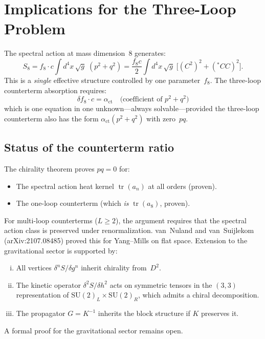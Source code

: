 \documentclass[12pt,a4paper]{article}
\newcommand{\tr}{\operatorname{tr}}
\begin{document}
\section{Implications for the Three-Loop Problem}
\label{sec:fund}

The spectral action at mass dimension~8 generates:
\begin{equation}
  S_8 = f_8 \cdot c \int d^4x\,\sqrt{g}\; (p^2 + q^2)
  = \frac{f_8 c}{2} \int d^4x\,\sqrt{g}\;
  \bigl[(C^2)^2 + ({}^*\!CC)^2\bigr].
\end{equation}
This is a \emph{single} effective structure controlled by one parameter~$f_8$.
The three-loop counterterm absorption requires:
\begin{equation}
  \delta f_8 \cdot c = \alpha_{\mathrm{ct}} \quad \text{(coefficient of } p^2{+}q^2)
\end{equation}
which is one equation in one unknown---always solvable---provided the
three-loop counterterm also has the form $\alpha_{\mathrm{ct}}(p^2 + q^2)$
with zero~$pq$.

\subsection{Status of the counterterm ratio}

The chirality theorem proves $pq = 0$ for:
\begin{itemize}
  \item The spectral action heat kernel $\tr(a_n)$ at all orders (proven).
  \item The one-loop counterterm (which \emph{is} $\tr(a_8)$, proven).
\end{itemize}
For multi-loop counterterms ($L \geq 2$), the argument requires that the
spectral action class is preserved under renormalization.  van~Nuland and
van~Suijlekom (arXiv:2107.08485) proved this for Yang--Mills on flat space.
Extension to the gravitational sector is supported by:
\begin{enumerate}[(i)]
  \item All vertices $\delta^n S/\delta g^n$ inherit chirality from~$D^2$.
  \item The kinetic operator $\delta^2 S/\delta h^2$ acts on symmetric
    tensors in the $(3,3)$ representation of $\mathrm{SU}(2)_L \times \mathrm{SU}(2)_R$,
    which admits a chiral decomposition.
  \item The propagator $G = K^{-1}$ inherits the block structure if $K$
    preserves it.
\end{enumerate}
A formal proof for the gravitational sector remains open.
\end{document}

